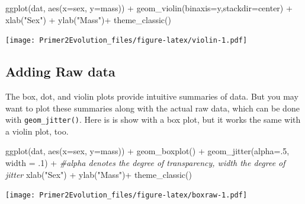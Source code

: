 \documentclass[
]{book}
\newenvironment{Shaded}{\begin{snugshade}}{\end{snugshade}}
\newcommand{\AttributeTok}[1]{\textcolor[rgb]{0.77,0.63,0.00}{#1}}
\newcommand{\CommentTok}[1]{\textcolor[rgb]{0.56,0.35,0.01}{\textit{#1}}}
\newcommand{\DecValTok}[1]{\textcolor[rgb]{0.00,0.00,0.81}{#1}}
\newcommand{\FunctionTok}[1]{\textcolor[rgb]{0.00,0.00,0.00}{#1}}
\newcommand{\NormalTok}[1]{#1}
\newcommand{\SpecialCharTok}[1]{\textcolor[rgb]{0.00,0.00,0.00}{#1}}
\newcommand{\StringTok}[1]{\textcolor[rgb]{0.31,0.60,0.02}{#1}}
\begin{document}
\begin{Shaded}
\begin{Highlighting}[]
\FunctionTok{ggplot}\NormalTok{(dat, }\FunctionTok{aes}\NormalTok{(}\AttributeTok{x=}\NormalTok{sex, }\AttributeTok{y=}\NormalTok{mass)) }\SpecialCharTok{+}
    \FunctionTok{geom\_violin}\NormalTok{(}\AttributeTok{binaxis=}\StringTok{\textquotesingle{}y\textquotesingle{}}\NormalTok{,}\AttributeTok{stackdir=}\StringTok{\textquotesingle{}center\textquotesingle{}}\NormalTok{) }\SpecialCharTok{+}
    \FunctionTok{xlab}\NormalTok{(}\StringTok{"Sex"}\NormalTok{) }\SpecialCharTok{+}
    \FunctionTok{ylab}\NormalTok{(}\StringTok{"Mass"}\NormalTok{)}\SpecialCharTok{+}
    \FunctionTok{theme\_classic}\NormalTok{()}
\end{Highlighting}
\end{Shaded}

\texttt{[image: Primer2Evolution\_files/figure-latex/violin-1.pdf]}

\hypertarget{adding-raw-data}{%
\subsection{Adding Raw data}\label{adding-raw-data}}

The box, dot, and violin plots provide intuitive summaries of data. But you may want to plot these summaries along with the actual raw data, which can be done with \texttt{geom\_jitter()}. Here is is show with a box plot, but it works the same with a violin plot, too.

\begin{Shaded}
\begin{Highlighting}[]
\FunctionTok{ggplot}\NormalTok{(dat, }\FunctionTok{aes}\NormalTok{(}\AttributeTok{x=}\NormalTok{sex, }\AttributeTok{y=}\NormalTok{mass)) }\SpecialCharTok{+}
    \FunctionTok{geom\_boxplot}\NormalTok{() }\SpecialCharTok{+}
    \FunctionTok{geom\_jitter}\NormalTok{(}\AttributeTok{alpha=}\NormalTok{.}\DecValTok{5}\NormalTok{, }\AttributeTok{width =}\NormalTok{ .}\DecValTok{1}\NormalTok{) }\SpecialCharTok{+} \CommentTok{\#alpha denotes the degree of transparency, width the degree of jitter}
    \FunctionTok{xlab}\NormalTok{(}\StringTok{"Sex"}\NormalTok{) }\SpecialCharTok{+}
    \FunctionTok{ylab}\NormalTok{(}\StringTok{"Mass"}\NormalTok{)}\SpecialCharTok{+}
    \FunctionTok{theme\_classic}\NormalTok{()}
\end{Highlighting}
\end{Shaded}

\texttt{[image: Primer2Evolution\_files/figure-latex/boxraw-1.pdf]}
\end{document}

